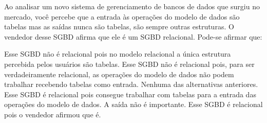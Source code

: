 \documentclass[12pt, addpoints]{exam}
\begin{document}
    \begin{questions}

    \newpage
    \question
Ao analisar um novo sistema de gerenciamento de bancos de dados que surgiu no
mercado, você percebe que a entrada às operações do modelo de dados são tabelas
mas as saídas nunca são tabelas, são sempre outras estruturas. O vendedor desse
SGBD afirma que ele é um SGBD relacional. Pode-se afirmar que:

\begin{choices}
\choice Esse SGBD não é relacional pois no modelo relacional a única estrutura percebida pelos usuários são tabelas.
\choice Esse SGBD não é relacional pois, para ser verdadeiramente relacional, as operações do modelo de dados não podem trabalhar recebendo tabelas como entrada.
\choice Nenhuma das alternativas anteriores.
\choice Esse SGBD é relacional pois consegue trabalhar com tabelas para a entrada das operações do modelo de dados. A saída não é importante.
\choice Esse SGBD é relacional pois o vendedor afirmou que é.
\end{choices}



    \end{questions}
    
\end{document}
